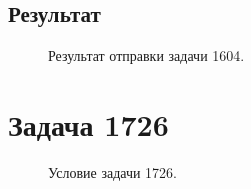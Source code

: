 \documentclass[a5paper, 10pt]{article}
\theoremstyle{definition}
\theoremstyle{plain}
\theoremstyle{remark}
\begin{document}
\subsection{Результат}
\begin{figure}[h]
\caption{Результат отправки задачи 1604.}
\end{figure}








\newpage


\section{Задача 1726}

\begin{figure}[h]
\caption{Условие задачи 1726.}
\end{figure}
\end{document}
